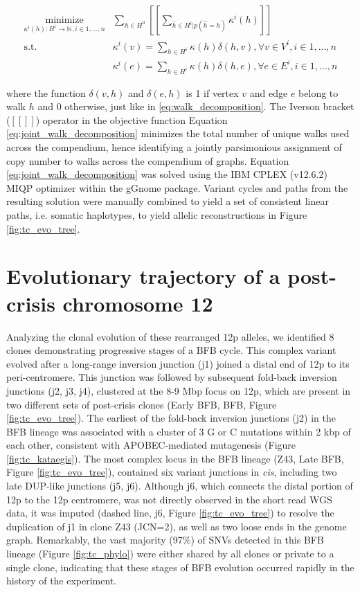 \documentclass[phd,tocprelim]{cornell}
\begin{document}
\begin{equation} \label{eq:joint_walk_decomposition}
    \begin{aligned}
        \underset{\kappa^i(h):H^i \rightarrow \mathbb{N}, i \in 1, \dots, n}{\text{minimize}} & \sum_{h \in H^0} [\![ \sum_{\hat{h} \in H^i | p(\hat{h} = h)} \kappa^i(h) ]\!] \\
        \text{s.t. } & \kappa^i(v) = \sum_{h \in H^i} \kappa(h)\delta(h, v), \forall v \in V^i, i \in 1, \dots, n \\
        & \kappa^i(e) = \sum_{h \in H^i} \kappa(h)\delta(h, e), \forall e \in E^i, i \in 1, \dots, n
    \end{aligned}
\end{equation}

where the function $\delta(v,h)$ and $\delta(e,h)$ is 1 if vertex $v$ and edge $e$ belong to walk $h$ and 0 otherwise, just like in \ref{eq:walk_decomposition}. The Iverson bracket ($[\![]\!]$) operator in the objective function Equation \ref{eq:joint_walk_decomposition} minimizes the total number of unique walks used across the compendium, hence identifying a jointly parsimonious assignment of copy number to walks across the compendium of graphs. Equation \ref{eq:joint_walk_decomposition} was solved using the IBM CPLEX (v12.6.2) MIQP optimizer within the gGnome package. Variant cycles and paths from the resulting solution were manually combined to yield a set of consistent linear paths, i.e. somatic haplotypes, to yield allelic reconstructions in Figure \ref{fig:tc_evo_tree}.

\section{Evolutionary trajectory of a post-crisis chromosome 12}
Analyzing the clonal evolution of these rearranged 12p alleles, we identified 8 clones demonstrating progressive stages of a BFB cycle. This complex variant evolved after a long-range inversion junction (j1) joined a distal end of 12p to its peri-centromere. This junction was followed by subsequent fold-back inversion junctions (j2, j3, j4), clustered at the 8-9 Mbp focus on 12p, which are present in two different sets of post-crisis clones (Early BFB, BFB, Figure \ref{fig:tc_evo_tree}). The earliest of the fold-back inversion junctions (j2) in the BFB lineage was associated with a cluster of 3 G or C mutations within 2 kbp of each other, consistent with APOBEC-mediated mutagenesis \cite{Maciejowski2020-bw} (Figure \ref{fig:tc_kataegis}). The most complex locus in the BFB lineage (Z43, Late BFB, Figure \ref{fig:tc_evo_tree}), contained six variant junctions in \textit{cis}, including two late DUP-like junctions (j5, j6). Although j6, which connects the distal portion of 12p to the 12p centromere, was not directly observed in the short read WGS data, it was imputed (dashed line, j6, Figure \ref{fig:tc_evo_tree}) to resolve the duplication of j1 in clone Z43 (JCN=2), as well as two loose ends in the genome graph. Remarkably, the vast majority (97\%) of SNVs detected in this BFB lineage (Figure \ref{fig:tc_phylo}) were either shared by all clones or private to a single clone, indicating that these stages of BFB evolution occurred rapidly in the history of the experiment.
\end{document}
